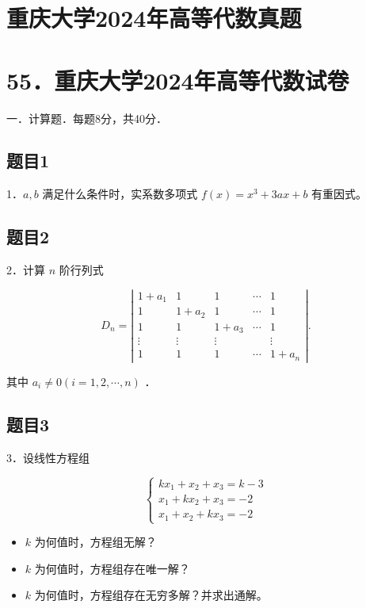\documentclass{article}
\begin{document}
\section*{重庆大学2024年高等代数真题}
\section*{55．重庆大学2024年高等代数试卷}
一．计算题．每题8分，共40分．\\

\subsection{题目1}
1．\(a, b\) 满足什么条件时，实系数多项式 \(f(x)=x^{3}+3 a x+b\) 有重因式。

\subsection{题目2}
2．计算 \(n\) 阶行列式

\[
D_{n}=\left|\begin{array}{ccccc}
1+a_{1} & 1 & 1 & \cdots & 1 \\
1 & 1+a_{2} & 1 & \cdots & 1 \\
1 & 1 & 1+a_{3} & \cdots & 1 \\
\vdots & \vdots & \vdots & & \vdots \\
1 & 1 & 1 & \cdots & 1+a_{n}
\end{array}\right| .
\]

其中 \(a_{i} \neq 0(i=1,2, \cdots, n)\) ．

\subsection{题目3}
3．设线性方程组

\[
\left\{\begin{array}{l}
k x_{1}+x_{2}+x_{3}=k-3 \\
x_{1}+k x_{2}+x_{3}=-2 \\
x_{1}+x_{2}+k x_{3}=-2
\end{array}\right.
\]

\begin{itemize}
  \item[（1）] \(k\) 为何值时，方程组无解？
  \item[（2）] \(k\) 为何值时，方程组存在唯一解？
  \item[（3）] \(k\) 为何值时，方程组存在无穷多解？并求出通解。
\end{itemize}
\end{document}

